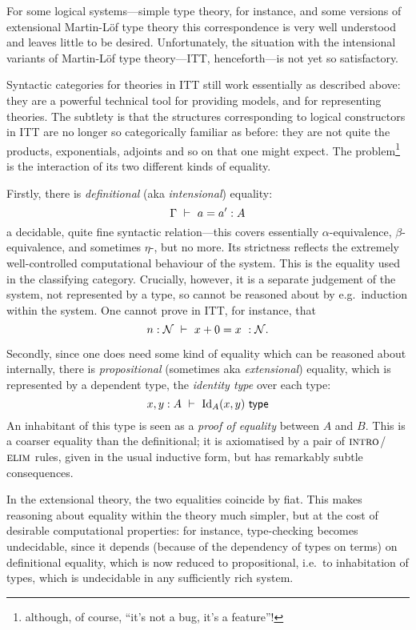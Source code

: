 \begin{para}
For some logical systems---simple type theory, for instance, and some versions of extensional Martin-Löf type theory this correspondence is very well understood and leaves little to be desired.  Unfortunately, the situation with the intensional variants of Martin-Löf type theory---ITT, henceforth---is not yet so satisfactory.

Syntactic categories for theories in ITT still work essentially as described above: they are a powerful technical tool for providing models, and for representing theories.  The subtlety is that the structures corresponding to logical constructors in ITT are no longer so categorically familiar as before: they are not quite the products, exponentials, adjoints and so on that one might expect.  The problem\footnote{although, of course, ``it's not a bug, it's a feature''!} is the interaction of its two different kinds of equality.

Firstly, there is \emph{definitional} (aka \emph{intensional}) equality:
\[\Gamma\ \vdash\ a = a' : A\]
a decidable, quite fine syntactic relation---this covers essentially $\alpha$-equivalence, $\beta$-equivalence, and sometimes $\eta$-, but no more.  Its strictness reflects the extremely well-controlled computational behaviour of the system.  This is the equality used in the classifying category.  Crucially, however, it is a separate judgement of the system, not represented by a type, so cannot be reasoned about by e.g.\ induction within the system.  One cannot prove in ITT, for instance, that 
\[n : \mathcal{N}\ \vdash\ x+0 = x\ : \mathcal{N}. \]

Secondly, since one does need some kind of equality which can be reasoned about internally, there is \emph{propositional} (sometimes aka \emph{extensional}) equality, which is represented by a dependent type, the \emph{identity type} over each type:
\[ x, y : A\ \vdash\ \mathrm{Id}_A(x,y)\ \mathsf{type}\]
An inhabitant of this type is seen as a \emph{proof of equality} between $A$ and $B$.  This is a coarser equality than the definitional; it is axiomatised by a pair of $\textsc{intro}$/$\textsc{elim}$ rules, given in the usual inductive form, but has remarkably subtle consequences.

In the extensional theory, the two equalities coincide by fiat.  This makes reasoning about equality within the theory much simpler, but at the cost of desirable computational properties: for instance, type-checking becomes undecidable, since it depends (because of the dependency of types on terms) on definitional equality, which is now reduced to propositional, i.e.\ to inhabitation of types, which is undecidable in any sufficiently rich system.


\end{para}
